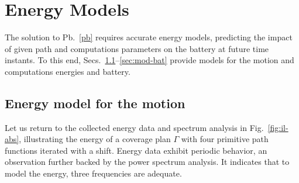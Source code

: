 \documentclass[letterpaper,10pt,journal,twoside]{IEEEtran}
\theoremstyle{definition}
\newtheorem{defn}{Definition}[section]
\newtheorem{pb}{Problem}[section]
\begin{document}




\vspace*{-1ex}
\section{Energy Models}  %
\label{sec:energy-model} %
The solution to Pb.~\ref{pb} requires accurate energy models, predicting the impact of given path and computations parameters on the battery at future time instants. To this end, Secs.~\ref{sec:mod-mot}--\ref{sec:mod-bat} provide models for the motion and computations energies and battery.

\vspace*{-2ex}
\subsection{Energy model for the motion}
\label{sec:mod-mot}

Let us return to the collected energy data and spectrum analysis in Fig.~\ref{fig:il-abs}, illustrating the energy of a coverage plan $\Gamma$ with four primitive path functions iterated with a shift. Energy data exhibit periodic behavior, an observation further backed by the power spectrum analysis. It indicates that to model the energy, three frequencies are adequate.
\end{document}
